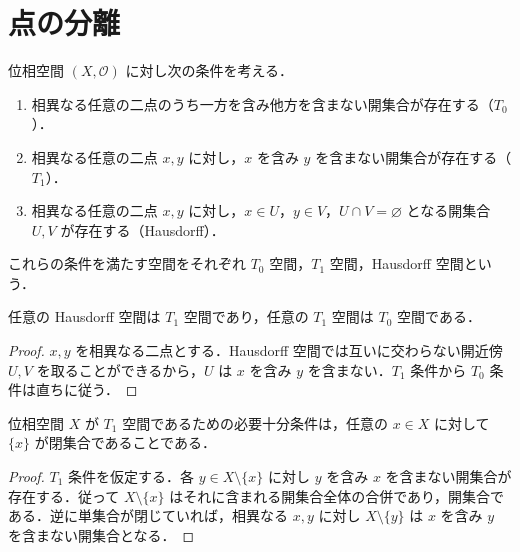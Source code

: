\section{点の分離}
\begin{defn}[T0・T1・Hausdorff空間]
位相空間 $(X,\mathcal O)$ に対し次の条件を考える．
\begin{enumerate}
\item 相異なる任意の二点のうち一方を含み他方を含まない開集合が存在する（$T_0$）．
\item 相異なる任意の二点 $x,y$ に対し，$x$ を含み $y$ を含まない開集合が存在する（$T_1$）．
\item 相異なる任意の二点 $x,y$ に対し，$x\in U$，$y\in V$，$U\cap V=\varnothing$ となる開集合 $U,V$ が存在する（Hausdorff）．
\end{enumerate}
これらの条件を満たす空間をそれぞれ $T_0$ 空間，$T_1$ 空間，Hausdorff 空間という．
\end{defn}
\begin{prop}[分離公理の含意]
任意の Hausdorff 空間は $T_1$ 空間であり，任意の $T_1$ 空間は $T_0$ 空間である．
\end{prop}
\begin{proof}
$x,y$ を相異なる二点とする．Hausdorff 空間では互いに交わらない開近傍 $U,V$ を取ることができるから，$U$ は $x$ を含み $y$ を含まない．$T_1$ 条件から $T_0$ 条件は直ちに従う．
\end{proof}
\begin{prop}[T1空間の特徴づけ]
位相空間 $X$ が $T_1$ 空間であるための必要十分条件は，任意の $x\in X$ に対して $\{x\}$ が閉集合であることである．
\end{prop}
\begin{proof}
$T_1$ 条件を仮定する．各 $y\in X\setminus\{x\}$ に対し $y$ を含み $x$ を含まない開集合が存在する．従って $X\setminus\{x\}$ はそれに含まれる開集合全体の合併であり，開集合である．逆に単集合が閉じていれば，相異なる $x,y$ に対し $X\setminus\{y\}$ は $x$ を含み $y$ を含まない開集合となる．
\end{proof}
